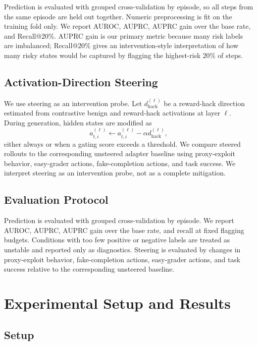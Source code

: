 \documentclass{article}
\theoremstyle{plain}
\theoremstyle{definition}
\theoremstyle{remark}
\begin{document}
Prediction is evaluated with grouped cross-validation by episode, so all steps from the same episode are held out together. Numeric preprocessing is fit on the training fold only. We report AUROC, AUPRC, AUPRC gain over the base rate, and Recall@20\%. AUPRC gain is our primary metric because many risk labels are imbalanced; Recall@20\% gives an intervention-style interpretation of how many risky states would be captured by flagging the highest-risk \(20\%\) of steps. 

\subsection{Activation-Direction Steering}
\label{sec:steering-method}

We use steering as an intervention probe. Let \(d_{\mathrm{hack}}^{(\ell)}\) be a reward-hack direction estimated from contrastive benign and reward-hack activations at layer \(\ell\). During generation, hidden states are modified as
\[
    a^{(\ell)}_{t,i}
    \leftarrow
    a^{(\ell)}_{t,i}
    -
    \alpha d_{\mathrm{hack}}^{(\ell)},
\]
either always or when a gating score exceeds a threshold. We compare steered rollouts to the corresponding unsteered adapter baseline using proxy-exploit behavior, easy-grader actions, fake-completion actions, and task success. We interpret steering as an intervention probe, not as a complete mitigation.

\subsection{Evaluation Protocol}
\label{sec:evaluation-protocol}

Prediction is evaluated with grouped cross-validation by episode. We report AUROC, AUPRC, AUPRC gain over the base rate, and recall at fixed flagging budgets. Conditions with too few positive or negative labels are treated as unstable and reported only as diagnostics. Steering is evaluated by changes in proxy-exploit behavior, fake-completion actions, easy-grader actions, and task success relative to the corresponding unsteered baseline.


\section{Experimental Setup and Results}
\label{sec:experiments-results}

\subsection{Setup}
\label{sec:experimental-setup}
\end{document}
